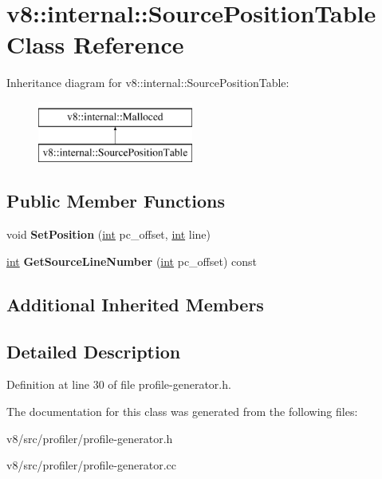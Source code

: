 \hypertarget{classv8_1_1internal_1_1SourcePositionTable}{}\section{v8\+:\+:internal\+:\+:Source\+Position\+Table Class Reference}
\label{classv8_1_1internal_1_1SourcePositionTable}
Inheritance diagram for v8\+:\+:internal\+:\+:Source\+Position\+Table\+:\begin{figure}[H]
\begin{center}
\leavevmode
\includegraphics[height=2.000000cm]{classv8_1_1internal_1_1SourcePositionTable}
\end{center}
\end{figure}
\subsection*{Public Member Functions}
\begin{DoxyCompactItemize}
\item 
\mbox{\label{classv8_1_1internal_1_1SourcePositionTable_a440f1f2ab552bc3464c6c77ad26cfacc}} 
void {\bfseries Set\+Position} (\mbox{\hyperlink{classint}{int}} pc\+\_\+offset, \mbox{\hyperlink{classint}{int}} line)
\item 
\mbox{\label{classv8_1_1internal_1_1SourcePositionTable_a722cc923302ef4e5cfb389c6477c1cb8}} 
\mbox{\hyperlink{classint}{int}} {\bfseries Get\+Source\+Line\+Number} (\mbox{\hyperlink{classint}{int}} pc\+\_\+offset) const
\end{DoxyCompactItemize}
\subsection*{Additional Inherited Members}


\subsection{Detailed Description}


Definition at line 30 of file profile-\/generator.\+h.



The documentation for this class was generated from the following files\+:\begin{DoxyCompactItemize}
\item 
v8/src/profiler/profile-\/generator.\+h\item 
v8/src/profiler/profile-\/generator.\+cc\end{DoxyCompactItemize}
